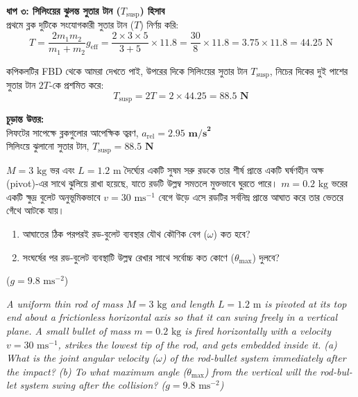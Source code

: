 \documentclass[12pt, a4paper]{article}
\begin{document}
\begin{tcolorbox}[solutionbox={সমাধান (Solution)}]
\vspace{0.5em}
\noindent
\textbf{ধাপ ৩: সিলিংয়ের ঝুলন্ত সুতার টান ($T_{\text{susp}}$) হিসাব} \\
প্রথমে ব্লক দুটিকে সংযোগকারী সুতার টান ($T$) নির্ণয় করি:
$$T = \frac{2 m_1 m_2}{m_1 + m_2} g_{\text{eff}} = \frac{2 \times 3 \times 5}{3 + 5} \times 11.8 = \frac{30}{8} \times 11.8 = 3.75 \times 11.8 = 44.25\text{ N}$$

কপিকলটির FBD থেকে আমরা দেখতে পাই, উপরের দিকে সিলিংয়ের সুতার টান $T_{\text{susp}}$, নিচের দিকের দুই পাশের সুতার টান $2T$-কে প্রশমিত করে:
$$T_{\text{susp}} = 2T = 2 \times 44.25 = \mathbf{88.5\text{ N}}$$

\vspace{1em}
\begin{tcolorbox}[answerbox]
\textbf{চূড়ান্ত উত্তর:} \\
লিফটের সাপেক্ষে ব্লকগুলোর আপেক্ষিক ত্বরণ, $a_{\text{rel}} = \mathbf{2.95\text{ m/s}^2}$ \\
সিলিংয়ে ঝুলানো সুতার টান, $T_{\text{susp}} = \mathbf{88.5\text{ N}}$
\end{tcolorbox}
\end{tcolorbox}

\begin{tcolorbox}[questionbox={প্রশ্ন (Question) 14}]
\noindent
$M = 3\text{ kg}$ ভর এবং $L = 1.2\text{ m}$ দৈর্ঘ্যের একটি সুষম সরু রডকে তার শীর্ষ প্রান্তে একটি ঘর্ষণহীন অক্ষ (pivot)-এর সাথে ঝুলিয়ে রাখা হয়েছে, যাতে রডটি উল্লম্ব সমতলে মুক্তভাবে ঘুরতে পারে। $m = 0.2\text{ kg}$ ভরের একটি ক্ষুদ্র বুলেট অনুভূমিকভাবে $v = 30\text{ ms}^{-1}$ বেগে উড়ে এসে রডটির সর্বনিম্ন প্রান্তে আঘাত করে তার ভেতরে গেঁথে আটকে যায়। 
\begin{enumerate}
    \item[(ক)] আঘাতের ঠিক পরপরই রড-বুলেট ব্যবস্থার যৌথ কৌণিক বেগ ($\omega$) কত হবে?
    \item[(খ)] সংঘর্ষের পর রড-বুলেট ব্যবস্থাটি উল্লম্ব রেখার সাথে সর্বোচ্চ কত কোণে ($\theta_{\max}$) দুলবে?
\end{enumerate}
($g = 9.8\text{ ms}^{-2}$)

\vspace{0.8em}
\begin{english}
\noindent\textit{\color{darkgray}
A uniform thin rod of mass $M = 3\text{ kg}$ and length $L = 1.2\text{ m}$ is pivoted at its top end about a frictionless horizontal axis so that it can swing freely in a vertical plane. A small bullet of mass $m = 0.2\text{ kg}$ is fired horizontally with a velocity $v = 30\text{ ms}^{-1}$, strikes the lowest tip of the rod, and gets embedded inside it. 
(a) What is the joint angular velocity ($\omega$) of the rod-bullet system immediately after the impact? 
(b) To what maximum angle ($\theta_{\max}$) from the vertical will the rod-bullet system swing after the collision? ($g = 9.8\text{ ms}^{-2}$)
}
\end{english}
\end{tcolorbox}
\end{document}
